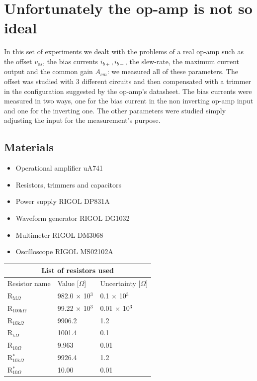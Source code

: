 \chapter{Unfortunately the op-amp is not so ideal}
In this set of experiments we dealt with the problems of a real op-amp such as the offset $v_{os}$, the bias currents $i_{b+},i_{b-}$, the slew-rate, the maximum current output and the common gain $A_{cm}$: we measured all of these parameters. The offset was studied with 3 different circuits and then compensated with a trimmer in the configuration suggested by the op-amp's datasheet. The bias currents were measured in two ways, one for the bias current in the non inverting op-amp input and one for the inverting one. The other parameters were studied simply adjusting the input for the measurement's purpose.

\section{Materials}
\begin{itemize}
\item Operational amplifier uA741
\item Resistors, trimmers and capacitors
\item Power supply RIGOL DP831A
\item Waveform generator RIGOL DG1032
\item Multimeter RIGOL DM3068
\item Oscilloscope RIGOL MS02102A
\end{itemize}
\begin{table}[H]
\centering
\begin{tabular}{ |p{3cm}||p{3cm}|p{3cm}| }
 \hline
 \multicolumn{3}{|c|}{List of resistors used} \\
 \hline
 Resistor name & Value [$\Omega$] & Uncertainty [$\Omega$]\\
 \hline
 R$_{\text{M}\Omega}$   & 982.0 $\times$ 10$^3$ & 0.1 $\times$ 10$^3$  \\
 R$_{100\text{k}\Omega}$& 99.22 $\times$ 10$^3$ & 0.01 $\times$ 10$^3$ \\
 R$_{10\text{k}\Omega}$ &   9906.2            & 1.2         \\
 R$_{\text{k}\Omega}$   &  1001.4             & 0.1         \\
 R$_{10\Omega}$         &  9.963              & 0.01        \\
 R$_{10\text{k}\Omega}^*$ &  9926.4             & 1.2         \\
 R$_{10\Omega}^*$       &10.00                & 0.01        \\ 
 \hline
\end{tabular}
\end{table}

